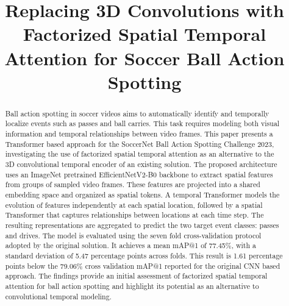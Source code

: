 \documentclass[conference]{IEEEtran}
\begin{document}
\title{Replacing 3D Convolutions with Factorized Spatial Temporal Attention for Soccer Ball Action Spotting}

\author{
\and
{}
\and
{}
}
\graphicspath{ {./images/} }
\maketitle

\begin{abstract}
Ball action spotting in soccer videos aims to automatically identify and temporally localize events such as passes and ball carries. This task requires modeling both visual information and temporal relationships between video frames. This paper presents a Transformer based approach for the SoccerNet Ball Action Spotting Challenge 2023, investigating the use of factorized spatial temporal attention as an alternative to the 3D convolutional temporal encoder of an existing solution. The proposed architecture uses an ImageNet pretrained EfficientNetV2-B0 backbone to extract spatial features from groups of sampled video frames. These features are projected into a shared embedding space and organized as spatial tokens. A temporal Transformer models the evolution of features independently at each spatial location, followed by a spatial Transformer that captures relationships between locations at each time step. The resulting representations are aggregated to predict the two target event classes: passes and drives. The model is evaluated using the seven fold cross-validation protocol adopted by the original solution. It achieves a mean mAP@1 of 77.45\%, with a standard deviation of 5.47 percentage points across folds. This result is 1.61 percentage points below the 79.06\% cross validation mAP@1 reported for the original CNN based approach. The findings provide an initial assessment of factorized spatial temporal attention for ball action spotting and highlight its potential as an alternative to convolutional temporal modeling.
\end{abstract}
\end{document}
